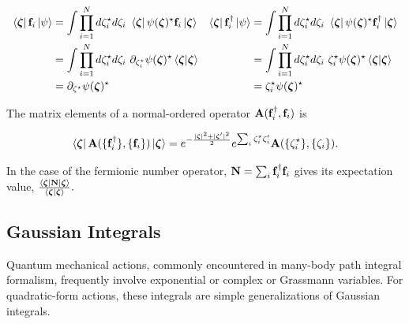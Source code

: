 \documentclass{homework}
\begin{document}
\begin{equation}
\begin{array}{cc}
    \begin{split}
        \bra{\bm{\zeta}} {{\bf f}}_i \ket{\psi} &= \int \prod_{i=1}^{N} d{\zeta}^\star_i d\zeta_i \textnormal{ } \bra{\bm{\zeta}} \psi({\bm \zeta)^\star} {{\bf f}}_i \ket{\bm{\zeta}} \\
        &= \int \prod_{i=1}^{N} d{\zeta}^\star_i d\zeta_i \textnormal{ } \partial_{\zeta_i^\star} \psi({\bm \zeta)^\star} \bra{\bm{\zeta}}\ket{\bm{\zeta}} \\
        &= \partial_{{\zeta^\star}}\psi({\bm \zeta)^\star}
    \end{split} & \begin{split}
         \bra{\bm{\zeta}} {{\bf f}}_i^\dagger \ket{\psi} &= \int \prod_{i=1}^{N} d{\zeta}^\star_i d\zeta_i \textnormal{ } \bra{\bm{\zeta}} \psi({\bm \zeta)^\star} {{\bf f}}_i^\dagger \ket{\bm{\zeta}} \\
        &= \int \prod_{i=1}^{N} d{\zeta}^\star_i d\zeta_i \textnormal{ } {\zeta_i^\star} \psi({\bm \zeta)^\star} \bra{\bm{\zeta}}\ket{\bm{\zeta}} \\
        &= {\zeta_i^\star} \psi({\bm \zeta)^\star}
    \end{split}  \\
   \end{array}  
\end{equation}
   
The matrix elements of a normal-ordered operator ${\bf A}({{{\bf f}}_i^\dagger
}, {{\bf f}}_i)$ is 

$$
\bra{\bm{\zeta}} {{\bf A}}(\{{{\bf f}}_i^\dagger
\}, \{{\bf f}_i\}) \ket{\bm{\zeta}} = e^{-\frac{|\bm{\zeta}|^2 + |\bm{\zeta}'|^2}{2}} e^{\sum_{i} \zeta_i^\star \zeta_i'} {{\bf A}}(\{\zeta_i^\star\}, \{\zeta_i\}).
$$

In the case of the fermionic number operator, ${{\bf N}} = \sum_{i} {{\bf f}}_i^\dagger {{\bf f}}_i$ gives its expectation value, 
$
\frac{\bra{\bm{\zeta}} {{\bf N}} \ket{\bm{\zeta}}}{\bra{\bm{\zeta}} \ket{\bm{\zeta}}}.
$

\clearpage

\subsection{Gaussian Integrals}
 
Quantum mechanical actions, commonly encountered in many-body path integral formalism, frequently involve exponential or complex or Grassmann variables. For quadratic-form actions, these integrals are simple generalizations of Gaussian integrals. 
\end{document}
